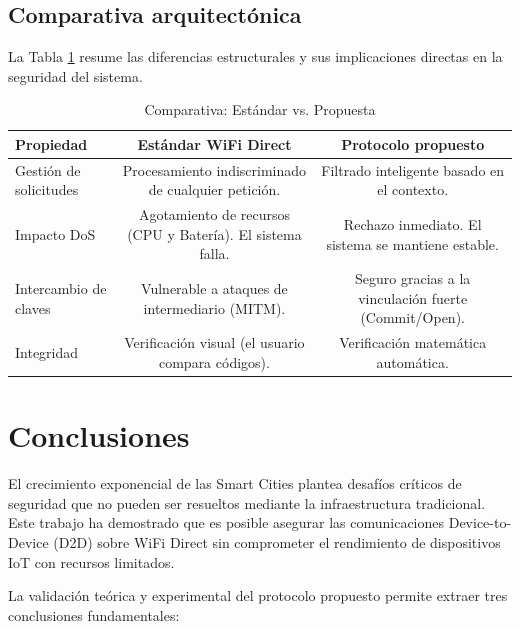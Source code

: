 \documentclass[conference,a4paper,onecolumn,11pt]{IEEEtran} %
\begin{document}
\subsection{Comparativa arquitectónica}
La Tabla \ref{tab:comparativa} resume las diferencias estructurales y sus implicaciones directas en la seguridad del sistema.

\begin{table}[htbp]
    \centering
    \caption{Comparativa: Estándar vs. Propuesta}
    \label{tab:comparativa}
    \begin{tabular}{lcc}
        \hline
        \textbf{Propiedad} & \textbf{Estándar WiFi Direct} & \textbf{Protocolo propuesto} \\
        \hline
        Gestión de solicitudes & Procesamiento indiscriminado de cualquier petición. & Filtrado inteligente basado en el contexto. \\
        \hline
        Impacto DoS & Agotamiento de recursos (CPU y Batería). El sistema falla. & Rechazo inmediato. El sistema se mantiene estable. \\
        \hline
        Intercambio de claves & Vulnerable a ataques de intermediario (MITM). & Seguro gracias a la vinculación fuerte (Commit/Open). \\
        \hline
        Integridad & Verificación visual (el usuario compara códigos). & Verificación matemática automática. \\
        \hline
    \end{tabular}
\end{table}

\section{Conclusiones}

El crecimiento exponencial de las Smart Cities plantea desafíos críticos de seguridad que no pueden ser resueltos mediante la infraestructura tradicional. Este trabajo ha demostrado que es posible asegurar las comunicaciones Device-to-Device (D2D) sobre WiFi Direct sin comprometer el rendimiento de dispositivos IoT con recursos limitados.

La validación teórica y experimental del protocolo propuesto permite extraer tres conclusiones fundamentales:
\end{document}
